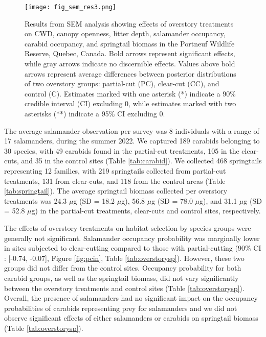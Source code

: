 \begin{figure}[ht]
	\centering
	\texttt{[image: fig\_sem\_res3.png]}
	\caption[Results from structural equation modeling analysis revealing effects of overstory treatments on coarse woody debris volume,
  canopy openness, litter depth, salamander occupancy, carabid occupancy, and springtail biomass.]
  {Results from SEM analysis showing effects of overstory treatments on CWD, 
  canopy openness, litter depth, salamander occupancy, carabid occupancy, and springtail biomass in the Portneuf Wildlife Reserve, 
  Quebec, Canada. Bold arrows represent significant effects, while gray arrows indicate no discernible effects. 
  Values above bold arrows represent average differences between posterior distributions of two overstory groups: 
  partial-cut (PC), clear-cut (CC), and control (C). Estimates marked with one asterisk (*) 
  indicate a 90\% credible interval (CI) excluding 0, while estimates marked with two asterisks (**) indicate a 95\% CI excluding 0.}
	\label{fig:SEMres}
\end{figure}  

\vspace{10pt}

The average salamander observation per survey was 8 individuals with a range of 17 salamanders, during the summer 2022.
We captured 189 carabids belonging to 30 species, with 49 carabids found in the partial-cut treatments, 105 in the clear-cuts, and 35 in the control sites (Table \ref{tab:carabid}). 
We collected 468 springtails representing 12 families, with 219 springtails collected from partial-cut treatments, 131 from clear-cuts, and 118 from the control areas (Table \ref{tab:springtail}). 
The average springtail biomass collected per overstory treatments was 24.3 $\mu$g (SD = 18.2 $\mu$g), 56.8 $\mu$g (SD = 78.0 $\mu$g), and 31.1 $\mu$g (SD = 52.8 $\mu$g) in the partial-cut treatments, clear-cuts and control sites, respectively.

The effects of overstory treatments on habitat selection by species groups were generally not significant. 
Salamander occupancy probability was marginally lower in sites subjected to clear-cutting compared to those with partial-cutting (90\% CI : [-0.74, -0.07], Figure \ref{fig:pcin}, Table \ref{tab:overstorysp}). 
However, these two groups did not differ from the control sites. 
Occupancy probability for both carabid groups, as well as the springtail biomass, did not vary significantly between the overstory treatments and control sites (Table \ref{tab:overstorysp}). 
Overall, the presence of salamanders had no significant impact on the occupancy probabilities of carabids representing prey for salamanders and we did not observe significant effects of either salamanders or carabids on springtail biomass (Table \ref{tab:overstorysp}).

